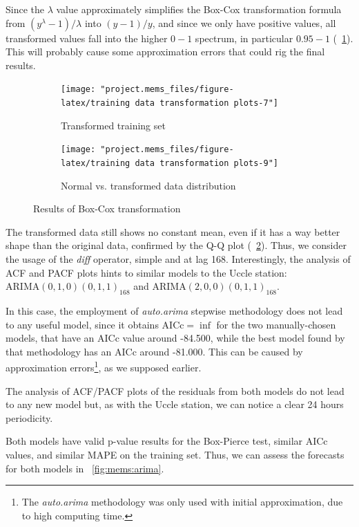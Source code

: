 \documentclass[12pt]{article}
\begin{document}
Since the $\lambda$ value approximately simplifies the Box-Cox transformation formula from $(y^\lambda-1)/\lambda$ into $(y-1)/y$, and since we only have positive values, all transformed values fall into the higher $0-1$ spectrum, in particular $0.95-1$ (\figurename~\ref{fig:mems:box-cox:data}). This will probably cause some approximation errors that could rig the final results.

\begin{figure}[h]
	\begin{subfigure}{.5\linewidth}
		\texttt{[image: "project.mems\_files/figure-latex/training data transformation plots-7"]}
		\caption{Transformed training set}
		\label{fig:mems:box-cox:data}
	\end{subfigure}
	\begin{subfigure}{.5\linewidth}
		\texttt{[image: "project.mems\_files/figure-latex/training data transformation plots-9"]}
		\caption{Normal vs. transformed data distribution}
		\label{fig:mems:box-cox:qq}
	\end{subfigure}
	\begin{center}
		\caption{Results of Box-Cox transformation}
		\label{fig:mems:box-cox}
	\end{center}
\end{figure}

The transformed data still shows no constant mean, even if it has a way better shape than the original data, confirmed by the Q-Q plot (\figurename~\ref{fig:mems:box-cox:qq}). Thus, we consider the usage of the \textit{diff} operator, simple and at lag 168. Interestingly, the analysis of ACF and PACF plots hints to similar models to the Uccle station: 
$\mathrm{ARIMA}(0,1,0)(0,1,1)_{168}$ and $\mathrm{ARIMA}(2,0,0)(0,1,1)_{168}$.

In this case, the employment of \textit{auto.arima} stepwise methodology does not lead to any useful model, since it obtains $\mathrm{AICc}=\inf$ for the two manually-chosen models, that have an AICc value around -84.500, while the best model found by that methodology has an AICc around -81.000. This can be caused by approximation errors\footnote{The \textit{auto.arima} methodology was only used with initial approximation, due to high computing time.}, as we supposed earlier.

The analysis of ACF/PACF plots of the residuals from both models do not lead to any new model but, as with the Uccle station, we can notice a clear 24 hours periodicity.

Both models have valid p-value results for the Box-Pierce test, similar AICc values, and similar MAPE on the training set. Thus, we can assess the forecasts for both models in \figurename~\ref{fig:mems:arima}.
\end{document}
